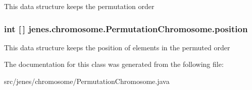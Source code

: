 This data structure keeps the permutation order \hypertarget{classjenes_1_1chromosome_1_1_permutation_chromosome_eb2d393eb8a9cc106205e13fb88446cc}{
\subsubsection[position]{\setlength{\rightskip}{0pt plus 5cm}int \mbox{[}$\,$\mbox{]} {\bf jenes.chromosome.PermutationChromosome.position}}}
\label{classjenes_1_1chromosome_1_1_permutation_chromosome_eb2d393eb8a9cc106205e13fb88446cc}


This data structure keeps the position of elements in the permuted order 

The documentation for this class was generated from the following file:\begin{CompactItemize}
\item 
src/jenes/chromosome/PermutationChromosome.java\end{CompactItemize}
